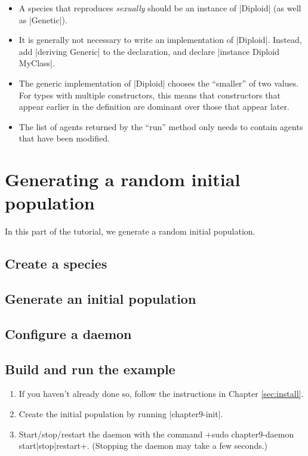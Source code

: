 \documentclass[a4paper,10pt]{report}
\begin{document}
\begin{itemize}
\item A species that reproduces \emph{sexually} should be an instance of
|Diploid| (as well as |Genetic|).
\item It is generally not necessary to write an implementation of |Diploid|.
Instead, add |deriving Generic| to the declaration,
and declare |instance Diploid MyClass|.
\item The generic implementation of |Diploid| chooses the ``smaller'' of two values.
For types with multiple constructors, this means that constructors that appear
earlier in the definition are dominant over those that
appear later.
\item The list of agents returned by the ``run'' method only needs to contain agents that
have been modified.
\end{itemize}

\chapter{Generating a random initial population}
\label{sec:random}

In this part of the tutorial, we generate a random initial population.

\section{Create a species}
\label{sec:species4}



\section{Generate an initial population}
\label{sec:pop4}



\section{Configure a daemon}
\label{sec:daemon4}



\section{Build and run the example}
\label{sec:run4}

\begin{enumerate}
\item If you haven't already done so, follow the instructions in Chapter 
\ref{sec:install}.
\item Create the initial population by running |chapter9-init|.
\item Start/stop/restart the daemon with the command
\UndefineShortVerb{\|}
\DefineShortVerb{\+}
+sudo chapter9-daemon start|stop|restart+.
\UndefineShortVerb{\+}
\DefineShortVerb{\|}
(Stopping the daemon may take a few seconds.)
\end{enumerate}
\end{document}
